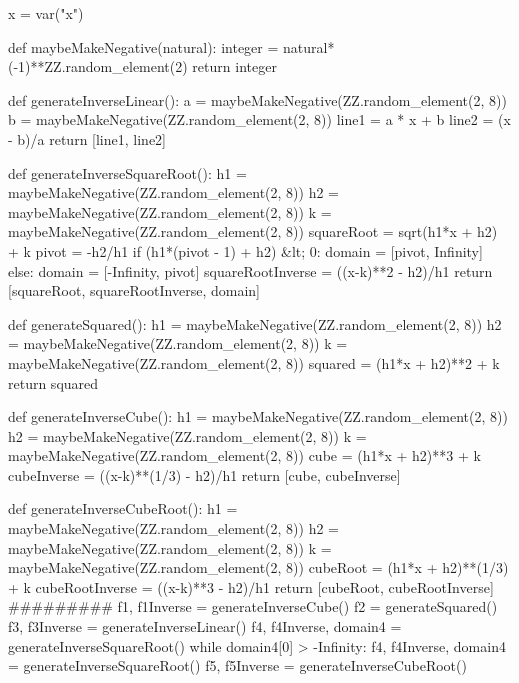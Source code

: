 \documentclass{ximera}
\begin{document}
\begin{sagesilent}
x = var("x")
 
def maybeMakeNegative(natural):
    integer = natural*(-1)**ZZ.random_element(2)
    return integer
 
def generateInverseLinear():
    a = maybeMakeNegative(ZZ.random_element(2, 8))
    b = maybeMakeNegative(ZZ.random_element(2, 8))
    line1 = a * x + b
    line2 = (x - b)/a
    return [line1, line2]
 
def generateInverseSquareRoot():
    h1 = maybeMakeNegative(ZZ.random_element(2, 8))
    h2 = maybeMakeNegative(ZZ.random_element(2, 8))
    k = maybeMakeNegative(ZZ.random_element(2, 8))
    squareRoot = sqrt(h1*x + h2) + k
    pivot = -h2/h1
    if (h1*(pivot - 1) + h2) &lt; 0:
        domain = [pivot, Infinity]
    else:
        domain = [-Infinity, pivot]
    squareRootInverse = ((x-k)**2 - h2)/h1
    return [squareRoot, squareRootInverse, domain]
 
def generateSquared():
    h1 = maybeMakeNegative(ZZ.random_element(2, 8))
    h2 = maybeMakeNegative(ZZ.random_element(2, 8))
    k = maybeMakeNegative(ZZ.random_element(2, 8))
    squared = (h1*x + h2)**2 + k
    return squared
 
def generateInverseCube():
    h1 = maybeMakeNegative(ZZ.random_element(2, 8))
    h2 = maybeMakeNegative(ZZ.random_element(2, 8))
    k = maybeMakeNegative(ZZ.random_element(2, 8))
    cube = (h1*x + h2)**3 + k
    cubeInverse = ((x-k)**(1/3) - h2)/h1
    return [cube, cubeInverse]
 
def generateInverseCubeRoot():
    h1 = maybeMakeNegative(ZZ.random_element(2, 8))
    h2 = maybeMakeNegative(ZZ.random_element(2, 8))
    k = maybeMakeNegative(ZZ.random_element(2, 8))
    cubeRoot = (h1*x + h2)**(1/3) + k
    cubeRootInverse = ((x-k)**3 - h2)/h1
    return [cubeRoot, cubeRootInverse]
#########
f1, f1Inverse = generateInverseCube()
f2 = generateSquared()
f3, f3Inverse = generateInverseLinear()
f4, f4Inverse, domain4 = generateInverseSquareRoot()
while domain4[0] > -Infinity:
    f4, f4Inverse, domain4 = generateInverseSquareRoot()
f5, f5Inverse = generateInverseCubeRoot()
 
\end{sagesilent}
 
\end{document}
